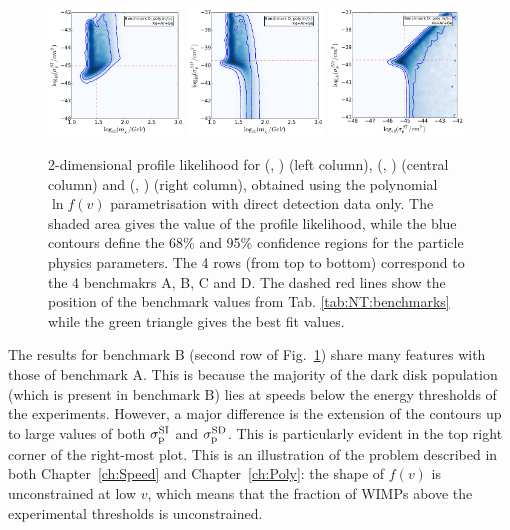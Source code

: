 \begin{figure}[pht!]
  \includegraphics[trim=0.2cm 0.2cm 0.2cm 0.2cm, clip,width=0.32\textwidth]{NT/BenchmarkD_poly_noIC-mx_sigsi.pdf}
  \includegraphics[trim=0.2cm 0.2cm 0.2cm 0.2cm, clip,width=0.32\textwidth]{NT/BenchmarkD_poly_noIC-mx_sigsd.pdf}
  \includegraphics[trim=0.2cm 0.2cm 0.2cm 0.2cm, clip,width=0.32\textwidth]{NT/BenchmarkD_poly_noIC-sigsi_sigsd.pdf}
\caption{2-dimensional profile likelihood for (\mchi, \sigmapsi) (left column), (\mchi, \sigmapsd) (central column) and (\sigmapsi, \sigmapsd) (right column), obtained using the polynomial $\ln f(v)$ parametrisation with direct detection data only. The shaded area gives the value of the profile likelihood, while the blue contours define the 68\% and 95\% confidence regions for the particle physics parameters. The 4 rows (from top to bottom) correspond to the 4 benchmakrs A, B, C and D. The dashed red lines show the position of the benchmark values from Tab. \ref{tab:NT:benchmarks} while the green triangle gives the best fit values.}
\label{fig:NT:withoutIC}
\end{figure}

The results for benchmark B (second row of Fig.~\ref{fig:NT:withoutIC}) share many features with those of benchmark A. This is because the majority of the dark disk population (which is present in benchmark B) lies at speeds below the energy thresholds of the experiments. However, a major difference is the extension of the contours up to large values of both $\sigmapsi$ and $\sigmapsd$. This is particularly evident in the top right corner of the right-most plot. This is an illustration of the problem described in both Chapter~\ref{ch:Speed} and Chapter~\ref{ch:Poly}: the shape of $f(v)$ is unconstrained at low $v$, which means that the fraction of WIMPs above the experimental thresholds is unconstrained. 


